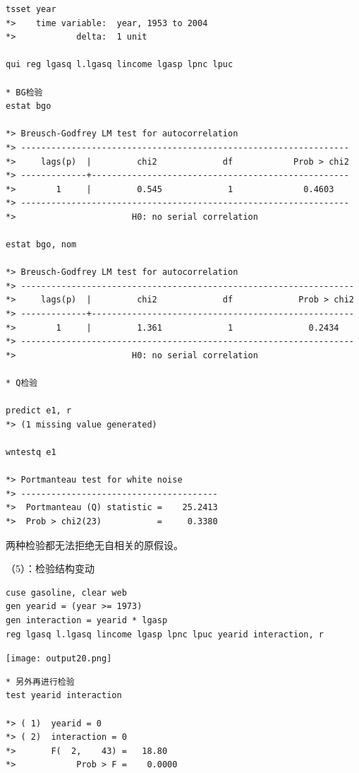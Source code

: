 \documentclass[cn,fancy,blue,11pt]{elegantbook}
\begin{document}
\begin{lstlisting}
tsset year
*>    time variable:  year, 1953 to 2004
*>            delta:  1 unit

qui reg lgasq l.lgasq lincome lgasp lpnc lpuc

* BG检验
estat bgo

*> Breusch-Godfrey LM test for autocorrelation
*> -----------------------------------------------------------------
*>     lags(p)  |         chi2             df            Prob > chi2
*> -------------+---------------------------------------------------
*>        1     |         0.545             1              0.4603
*> -----------------------------------------------------------------
*>                       H0: no serial correlation

estat bgo, nom

*> Breusch-Godfrey LM test for autocorrelation
*> ------------------------------------------------------------------
*>     lags(p)  |         chi2             df             Prob > chi2
*> -------------+----------------------------------------------------
*>        1     |         1.361             1               0.2434
*> ------------------------------------------------------------------
*>                       H0: no serial correlation

* Q检验

predict e1, r
*> (1 missing value generated)

wntestq e1

*> Portmanteau test for white noise
*> ---------------------------------------
*>  Portmanteau (Q) statistic =    25.2413
*>  Prob > chi2(23)           =     0.3380
\end{lstlisting}

两种检验都无法拒绝无自相关的原假设。

（5）：检验结构变动

\begin{lstlisting}
cuse gasoline, clear web
gen yearid = (year >= 1973)
gen interaction = yearid * lgasp
reg lgasq l.lgasq lincome lgasp lpnc lpuc yearid interaction, r
\end{lstlisting}

\noindent\texttt{[image: output20.png]}

\begin{lstlisting}
* 另外再进行检验
test yearid interaction

*> ( 1)  yearid = 0
*> ( 2)  interaction = 0
*>       F(  2,    43) =   18.80
*>            Prob > F =    0.0000
\end{lstlisting}
\end{document}
